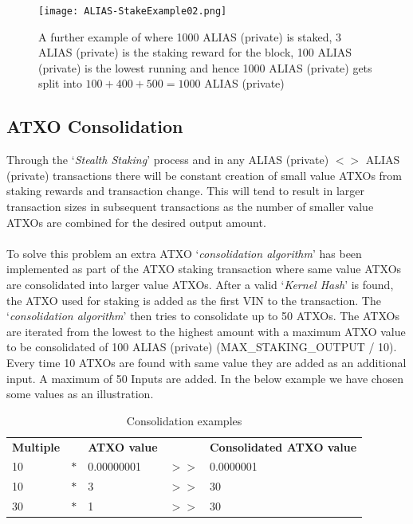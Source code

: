 \begin{figure}[ht]
	\centering
	\texttt{[image: ALIAS-StakeExample02.png]}
	\caption{A further example of where 1000 ALIAS (private) is staked, 3 ALIAS (private) 
	is the staking reward for the block, 100 ALIAS (private) is the lowest running 
	and hence 1000 ALIAS (private) gets split into $100 + 400 + 500 = 1000$ ALIAS (private)}
\end{figure}



\subsection{ATXO Consolidation}
Through the ‘\textit{Stealth Staking}’ process and in any ALIAS (private) $<>$
ALIAS (private) transactions there will be constant creation of small value ATXOs
from staking rewards and transaction change. This will tend to result in
larger transaction sizes in subsequent transactions as the number of
smaller value ATXOs are combined for the desired output amount.
\\
\\
\noindent
To solve this problem an extra ATXO ‘\textit{consolidation algorithm}’
has been implemented as part of the ATXO staking transaction where same
value ATXOs are consolidated into larger value ATXOs. After a valid
‘\textit{Kernel Hash}’ is found, the ATXO used for staking is added
as the first VIN to the transaction. The ‘\textit{consolidation algorithm}’
then tries to consolidate up to 50 ATXOs. The ATXOs are iterated from the
lowest to the highest amount with a maximum ATXO value to be consolidated
of 100 ALIAS (private) (MAX\_STAKING\_OUTPUT / 10). Every time 10 ATXOs are found
with same value they are added as an additional input. A maximum of 50
Inputs are added. In the below example we have chosen some values as an
illustration.



   \begin{table}[h]
	\centering
	\begin{tabular}{lllll}
		\textbf{Multiple} &     & \textbf{ATXO value} &      & \textbf{Consolidated ATXO value} \\
		10                & $*$ & 0.00000001          & $>>$ & 0.0000001 \\
		10                & $*$ & 3                   & $>>$ & 30        \\
		30                & $*$ & 1                   & $>>$ & 30        \\
	\end{tabular}

	\caption{Consolidation examples}
	\label{tbl:consolidationExamples}
\end{table}

